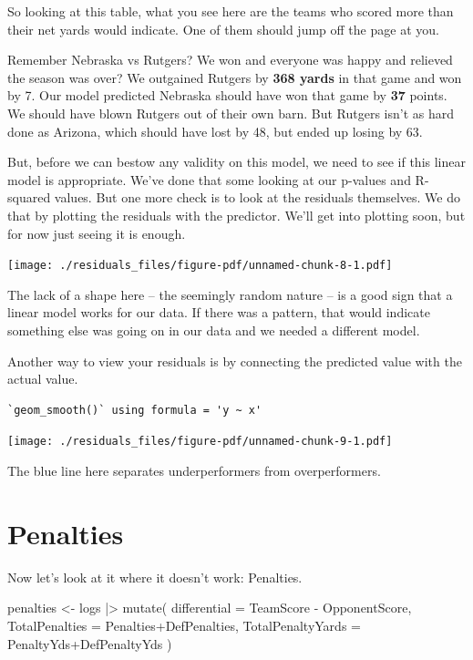 \documentclass[
  letterpaper,
  DIV=11,
  numbers=noendperiod]{scrreprt}
\newenvironment{Shaded}{\begin{snugshade}}{\end{snugshade}}
\newcommand{\AttributeTok}[1]{\textcolor[rgb]{0.40,0.45,0.13}{#1}}
\newcommand{\FunctionTok}[1]{\textcolor[rgb]{0.28,0.35,0.67}{#1}}
\newcommand{\NormalTok}[1]{\textcolor[rgb]{0.00,0.23,0.31}{#1}}
\newcommand{\OtherTok}[1]{\textcolor[rgb]{0.00,0.23,0.31}{#1}}
\newcommand{\SpecialCharTok}[1]{\textcolor[rgb]{0.37,0.37,0.37}{#1}}
\begin{document}
So looking at this table, what you see here are the teams who scored
more than their net yards would indicate. One of them should jump off
the page at you.

Remember Nebraska vs Rutgers? We won and everyone was happy and relieved
the season was over? We outgained Rutgers by \textbf{368 yards} in that
game and won by 7. Our model predicted Nebraska should have won that
game by \textbf{37} points. We should have blown Rutgers out of their
own barn. But Rutgers isn't as hard done as Arizona, which should have
lost by 48, but ended up losing by 63.

But, before we can bestow any validity on this model, we need to see if
this linear model is appropriate. We've done that some looking at our
p-values and R-squared values. But one more check is to look at the
residuals themselves. We do that by plotting the residuals with the
predictor. We'll get into plotting soon, but for now just seeing it is
enough.

\texttt{[image: ./residuals\_files/figure-pdf/unnamed-chunk-8-1.pdf]}

The lack of a shape here -- the seemingly random nature -- is a good
sign that a linear model works for our data. If there was a pattern,
that would indicate something else was going on in our data and we
needed a different model.

Another way to view your residuals is by connecting the predicted value
with the actual value.

\begin{verbatim}
`geom_smooth()` using formula = 'y ~ x'
\end{verbatim}

\texttt{[image: ./residuals\_files/figure-pdf/unnamed-chunk-9-1.pdf]}

The blue line here separates underperformers from overperformers.

\hypertarget{penalties}{%
\section{Penalties}\label{penalties}}

Now let's look at it where it doesn't work: Penalties.

\begin{Shaded}
\begin{Highlighting}[]
\NormalTok{penalties }\OtherTok{\textless{}{-}}\NormalTok{ logs }\SpecialCharTok{|\textgreater{}} 
  \FunctionTok{mutate}\NormalTok{(}
    \AttributeTok{differential =}\NormalTok{ TeamScore }\SpecialCharTok{{-}}\NormalTok{ OpponentScore, }
    \AttributeTok{TotalPenalties =}\NormalTok{ Penalties}\SpecialCharTok{+}\NormalTok{DefPenalties,}
    \AttributeTok{TotalPenaltyYards =}\NormalTok{ PenaltyYds}\SpecialCharTok{+}\NormalTok{DefPenaltyYds}
\NormalTok{  )}
\end{Highlighting}
\end{Shaded}
\end{document}

